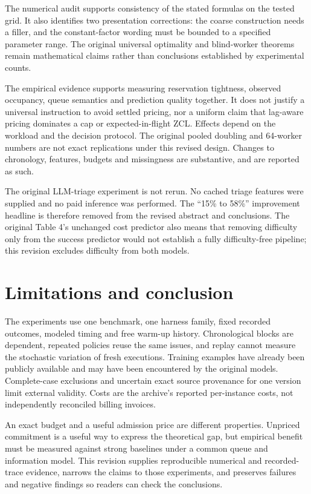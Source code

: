 \documentclass[11pt]{article}
\begin{document}
The numerical audit supports consistency of the stated formulas on the tested grid. It also identifies two presentation corrections: the coarse construction needs a filler, and the constant-factor wording must be bounded to a specified parameter range. The original universal optimality and blind-worker theorems remain mathematical claims rather than conclusions established by experimental counts.

The empirical evidence supports measuring reservation tightness, observed occupancy, queue semantics and prediction quality together. It does not justify a universal instruction to avoid settled pricing, nor a uniform claim that lag-aware pricing dominates a cap or expected-in-flight ZCL. Effects depend on the workload and the decision protocol. The original pooled doubling and 64-worker numbers are not exact replications under this revised design. Changes to chronology, features, budgets and missingness are substantive, and are reported as such.

The original LLM-triage experiment is not rerun. No cached triage features were supplied and no paid inference was performed. The ``15\% to 58\%'' improvement headline is therefore removed from the revised abstract and conclusions. The original Table 4's unchanged cost predictor also means that removing difficulty only from the success predictor would not establish a fully difficulty-free pipeline; this revision excludes difficulty from both models.

\section{Limitations and conclusion}
The experiments use one benchmark, one harness family, fixed recorded outcomes, modeled timing and free warm-up history. Chronological blocks are dependent, repeated policies reuse the same issues, and replay cannot measure the stochastic variation of fresh executions. Training examples have already been publicly available and may have been encountered by the original models. Complete-case exclusions and uncertain exact source provenance for one version limit external validity. Costs are the archive's reported per-instance costs, not independently reconciled billing invoices.

An exact budget and a useful admission price are different properties. Unpriced commitment is a useful way to express the theoretical gap, but empirical benefit must be measured against strong baselines under a common queue and information model. This revision supplies reproducible numerical and recorded-trace evidence, narrows the claims to those experiments, and preserves failures and negative findings so readers can check the conclusions.
\end{document}
